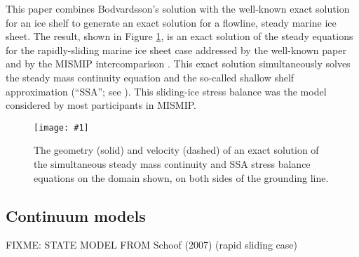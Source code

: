 \documentclass[twocolumn,letterpaper]{igs}
\newcommand{\onecol}[1]{\texttt{[image: \#1]}}
\begin{document}
This paper combines Bodvardsson's solution with the well-known exact solution for an ice shelf \cite{vanderVeen83,vanderVeen} to generate an exact solution for a flowline, steady marine ice sheet.  The result, shown in Figure \ref{fig:exactmarine}, is an exact solution of the steady equations for the rapidly-sliding marine ice sheet case addressed by the well-known paper \cite{SchoofMarine1} and by the MISMIP intercomparison \cite{MISMIP2012}.  This exact solution simultaneously solves the steady mass continuity equation and the so-called shallow shelf approximation (``SSA''; see \cite{BBssasliding,MacAyeal,WeisGreveHutter}).  This sliding-ice stress balance was the model considered by most participants in MISMIP.

\begin{figure}[ht]
\onecol{exactmarine-geometry}
\caption{The geometry (solid) and velocity (dashed) of an exact solution of the simultaneous steady mass continuity and SSA stress balance equations on the domain shown, on both sides of the grounding line.} \label{fig:exactmarine}
\end{figure}

\subsection*{Continuum models}

FIXME: STATE MODEL FROM Schoof (2007) (rapid sliding case)
\end{document}
